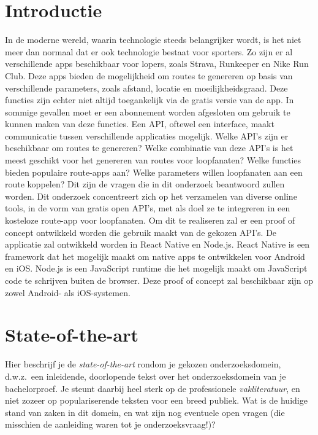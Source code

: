
\section{Introductie}%
\label{sec:introductie}

In de moderne wereld, waarin technologie steeds belangrijker wordt, is het niet meer dan normaal dat er ook technologie bestaat voor sporters. Zo zijn er al verschillende apps beschikbaar voor lopers, zoals Strava, Runkeeper en Nike Run Club.
Deze apps bieden de mogelijkheid om routes te genereren op basis van verschillende parameters, zoals afstand, locatie en moeilijkheidsgraad. Deze functies zijn echter niet altijd toegankelijk via de gratis versie van de app. 
In sommige gevallen moet er een abonnement worden afgesloten om gebruik te kunnen maken van deze functies. Een API, oftewel een interface, maakt communicatie tussen verschillende applicaties mogelijk.
Welke API's zijn er beschikbaar om routes te genereren? Welke combinatie van deze API's is het meest geschikt voor het genereren van routes voor loopfanaten? Welke functies bieden populaire route-apps aan? Welke parameters willen loopfanaten aan een route koppelen? Dit zijn de vragen die in dit onderzoek beantwoord zullen worden.
Dit onderzoek concentreert zich op het verzamelen van diverse online tools, in de vorm van gratis open API's, met als doel ze te integreren in een kosteloze route-app voor loopfanaten. 
Om dit te realiseren zal er een proof of concept ontwikkeld worden die gebruik maakt van de gekozen API's. De applicatie zal ontwikkeld worden in React Native en Node.js. React Native is een framework dat het mogelijk maakt om native apps te ontwikkelen voor Android en iOS\@. Node.js is een JavaScript runtime die het mogelijk maakt om JavaScript code te schrijven buiten de browser.
Deze proof of concept zal beschikbaar zijn op zowel Android- als iOS-systemen.



\section{State-of-the-art}%
\label{sec:state-of-the-art}

Hier beschrijf je de \emph{state-of-the-art} rondom je gekozen onderzoeksdomein, d.w.z.\ een inleidende, doorlopende tekst over het onderzoeksdomein van je bachelorproef. Je steunt daarbij heel sterk op de professionele \emph{vakliteratuur}, en niet zozeer op populariserende teksten voor een breed publiek. Wat is de huidige stand van zaken in dit domein, en wat zijn nog eventuele open vragen (die misschien de aanleiding waren tot je onderzoeksvraag!)?

